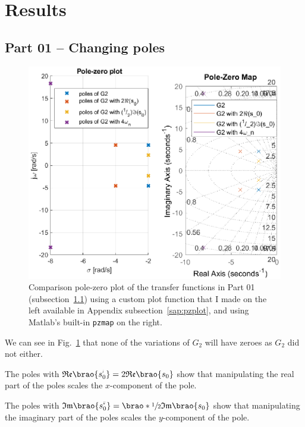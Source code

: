 \documentclass[12pt]{article}
\DeclarePairedDelimiter\brao()%
\newcommand{\setprime}[2][1]{%
    {#2}^{%
        \raisebox{1pt}{%
            \scalebox{0.5}{%
                \itshape\sffamily\uppercase%
                \expandafter{%
                    \romannumeral#1%
                }%
            }%
        }
    }%
}%
\begin{document}
\section{Results}

\subsection{Part 01 -- Changing poles}\label{ssc:part 01}

\begin{figure}
    \centering
    \includegraphics[width=\linewidth]{img/part01_pzplot_pzmap.eps}
    \caption{Comparison pole-zero plot of the transfer functions in Part 01 (subsection~\ref{ssc:part 01}) using a custom plot function that I made on the left available in Appendix subsection~\ref{sap:pzplot}, and using Matlab's built-in \texttt{pzmap} on the right.}
    \label{fig:part01_pzplot_pzmap}
\end{figure}

We can see in Fig.~\ref{fig:part01_pzplot_pzmap} that none of the variations of $G_2$ will have zeroes as $G_2$ did not either.

The poles with $\mathfrak{Re}\brao{\setprime{s}_0} = 2\mathfrak{Re}\brao{s_0}$ show that manipulating the real part of the poles scales the $x$-component of the pole.

The poles with $\mathfrak{Im}\brao{\setprime[2]s_0} = \brao*{\sfrac12}\mathfrak{Im}\brao{s_0}$ show that manipulating the imaginary part of the poles scales the $y$-component of the pole.
\end{document}
